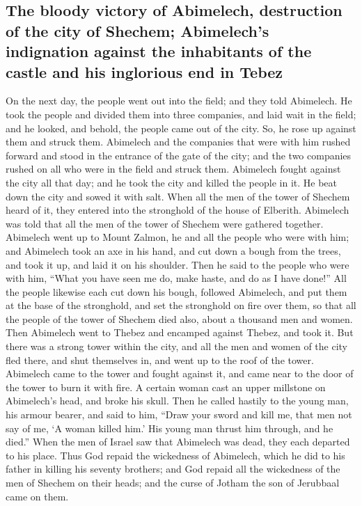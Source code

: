 \hypertarget{the-bloody-victory-of-abimelech-destruction-of-the-city-of-shechem-abimelechs-indignation-against-the-inhabitants-of-the-castle-and-his-inglorious-end-in-tebez}{%
\subsection{The bloody victory of Abimelech, destruction of the city of
Shechem; Abimelech's indignation against the inhabitants of the castle
and his inglorious end in
Tebez}\label{the-bloody-victory-of-abimelech-destruction-of-the-city-of-shechem-abimelechs-indignation-against-the-inhabitants-of-the-castle-and-his-inglorious-end-in-tebez}}

 On the next day, the people went out into the field; and
they told Abimelech.  He took the people and divided them
into three companies, and laid wait in the field; and he looked, and
behold, the people came out of the city. So, he rose up against them and
struck them.  Abimelech and the companies that were with
him rushed forward and stood in the entrance of the gate of the city;
and the two companies rushed on all who were in the field and struck
them.  Abimelech fought against the city all that day;
and he took the city and killed the people in it. He beat down the city
and sowed it with salt.  When all the men of the tower of
Shechem heard of it, they entered into the stronghold of the house of
Elberith.  Abimelech was told that all the men of the
tower of Shechem were gathered together.  Abimelech went
up to Mount Zalmon, he and all the people who were with him; and
Abimelech took an axe in his hand, and cut down a bough from the trees,
and took it up, and laid it on his shoulder. Then he said to the people
who were with him, ``What you have seen me do, make haste, and do as I
have done!''  All the people likewise each cut down his
bough, followed Abimelech, and put them at the base of the stronghold,
and set the stronghold on fire over them, so that all the people of the
tower of Shechem died also, about a thousand men and women.
 Then Abimelech went to Thebez and encamped against
Thebez, and took it.  But there was a strong tower within
the city, and all the men and women of the city fled there, and shut
themselves in, and went up to the roof of the tower. 
Abimelech came to the tower and fought against it, and came near to the
door of the tower to burn it with fire.  A certain woman
cast an upper millstone on Abimelech's head, and broke his skull.
 Then he called hastily to the young man, his armour
bearer, and said to him, ``Draw your sword and kill me, that men not say
of me, `A woman killed him.' His young man thrust him through, and he
died.''  When the men of Israel saw that Abimelech was
dead, they each departed to his place.  Thus God repaid
the wickedness of Abimelech, which he did to his father in killing his
seventy brothers;  and God repaid all the wickedness of
the men of Shechem on their heads; and the curse of Jotham the son of
Jerubbaal came on them.

